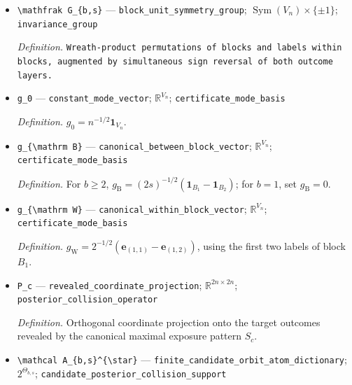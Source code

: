 \documentclass{article}
\begin{document}
\begin{itemize}
  \item \texttt{\textbackslash{}\allowbreak{}mathfrak G\_\allowbreak{}\{b,\allowbreak{}s\}\allowbreak{}} --- \texttt{block\_\allowbreak{}unit\_\allowbreak{}symmetry\_\allowbreak{}group}; \(\operatorname{Sym}(V_n)\times\{\pm1\}\); \texttt{invariance\_\allowbreak{}group}
  \par\smallskip\noindent\emph{Definition.} \texttt{Wreath-\allowbreak{}product permutations of blocks and labels within blocks,\allowbreak{} augmented by simultaneous sign reversal of both outcome layers.}
  \item \texttt{g\_\allowbreak{}0} --- \texttt{constant\_\allowbreak{}mode\_\allowbreak{}vector}; \(\mathbb R^{V_n}\); \texttt{certificate\_\allowbreak{}mode\_\allowbreak{}basis}
  \par\smallskip\noindent\emph{Definition.} \(g_0=n^{-1/2}\mathbf 1_{V_n}\).
  \item \texttt{g\_\allowbreak{}\{\textbackslash{}\allowbreak{}mathrm B\}\allowbreak{}} --- \texttt{canonical\_\allowbreak{}between\_\allowbreak{}block\_\allowbreak{}vector}; \(\mathbb R^{V_n}\); \texttt{certificate\_\allowbreak{}mode\_\allowbreak{}basis}
  \par\smallskip\noindent\emph{Definition.} For \(b\ge2\), \(g_{\mathrm B}=(2s)^{-1/2}(\mathbf 1_{B_1}-\mathbf 1_{B_2})\); for \(b=1\), set \(g_{\mathrm B}=0\).
  \item \texttt{g\_\allowbreak{}\{\textbackslash{}\allowbreak{}mathrm W\}\allowbreak{}} --- \texttt{canonical\_\allowbreak{}within\_\allowbreak{}block\_\allowbreak{}vector}; \(\mathbb R^{V_n}\); \texttt{certificate\_\allowbreak{}mode\_\allowbreak{}basis}
  \par\smallskip\noindent\emph{Definition.} \(g_{\mathrm W}=2^{-1/2}(\mathbf e_{(1,1)}-\mathbf e_{(1,2)})\), using the first two labels of block \(B_1\).
  \item \texttt{P\_\allowbreak{}c} --- \texttt{revealed\_\allowbreak{}coordinate\_\allowbreak{}projection}; \(\mathbb R^{2n\times2n}\); \texttt{posterior\_\allowbreak{}collision\_\allowbreak{}operator}
  \par\smallskip\noindent\emph{Definition.} Orthogonal coordinate projection onto the target outcomes revealed by the canonical maximal exposure pattern \(S_c\).
  \item \texttt{\textbackslash{}\allowbreak{}mathcal A\_\allowbreak{}\{b,\allowbreak{}s\}\allowbreak{}\textasciicircum{}\{\textbackslash{}\allowbreak{}star\}\allowbreak{}} --- \texttt{finite\_\allowbreak{}candidate\_\allowbreak{}orbit\_\allowbreak{}atom\_\allowbreak{}dictionary}; \(2^{\Theta_{b,s}}\); \texttt{candidate\_\allowbreak{}posterior\_\allowbreak{}collision\_\allowbreak{}support}

\end{itemize}
\end{document}
